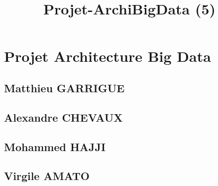 \documentclass[11pt]{article}
\title{Projet-ArchiBigData (5)}
\begin{document}
    
    
    \maketitle
    
    

    
    \hypertarget{projet-architecture-big-data}{%
\section{Projet Architecture Big
Data}\label{projet-architecture-big-data}}

    \hypertarget{matthieu-garrigue}{%
\subsection{Matthieu GARRIGUE}\label{matthieu-garrigue}}

\hypertarget{alexandre-chevaux}{%
\subsection{Alexandre CHEVAUX}\label{alexandre-chevaux}}

\hypertarget{mohammed-hajji}{%
\subsection{Mohammed HAJJI}\label{mohammed-hajji}}

\hypertarget{virgile-amato}{%
\subsection{Virgile AMATO}\label{virgile-amato}}
\end{document}
